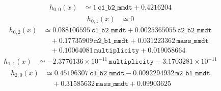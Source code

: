 \begin{equation}\begin{aligned}
h_{0,0}(x) &\simeq 1\,\mathtt{c1\_b2\_mmdt} + 0.4216204
\end{aligned}\end{equation}
\begin{equation}\begin{aligned}
h_{0,1}(x) &\simeq 0
\end{aligned}\end{equation}
\begin{equation}\begin{aligned}
h_{0,2}(x) &\simeq 0.088106595\,\mathtt{c1\_b2\_mmdt} + 0.0025365055\,\mathtt{c2\_b2\_mmdt}\\
&\quad  + 0.17735909\,\mathtt{m2\_b1\_mmdt} + 0.031223362\,\mathtt{mass\_mmdt}\\
&\quad  + 0.10064081\,\mathtt{multiplicity} + 0.019058664
\end{aligned}\end{equation}
\begin{equation}\begin{aligned}
h_{1,1}(x) &\simeq -2.3776136\!\times\!10^{-11}\,\mathtt{multiplicity} - 3.1703281\!\times\!10^{-11}
\end{aligned}\end{equation}
\begin{equation}\begin{aligned}
h_{2,0}(x) &\simeq 0.45196307\,\mathtt{c1\_b2\_mmdt} - 0.0092294932\,\mathtt{m2\_b1\_mmdt}\\
&\quad  + 0.31585632\,\mathtt{mass\_mmdt} + 0.09903625
\end{aligned}\end{equation}
